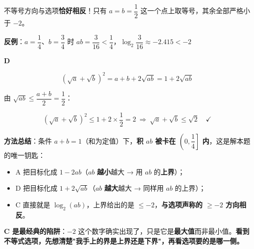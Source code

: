 \begin{answer}
不等号方向与选项\textbf{恰好相反}！只有 $a=b=\dfrac12$ 这一个点上取等号，其余全部严格小于 $-2$。

\textbf{反例}：$a=\dfrac14$、$b=\dfrac34$ 时 $ab=\dfrac3{16}<\dfrac14$，$\log_2\dfrac3{16}\approx-2.415<-2$ 

\par\medskip

\textbf{D }

\nopagebreak[4]
\[\left(\sqrt a+\sqrt b\right)^{2}=a+b+2\sqrt{ab}=1+2\sqrt{ab}\]

由 $\sqrt{ab}\le\dfrac{a+b}2=\dfrac12$：

\nopagebreak[4]
\[\left(\sqrt a+\sqrt b\right)^{2}\le1+2\times\frac12=2\ \Longrightarrow\ \sqrt a+\sqrt b\le\sqrt2\quad\checkmark\]

\begin{gktip}
\textbf{方法总结}：条件 $a+b=1$（和为定值）下，\textbf{积 $ab$ 被卡在 $\left(0,\dfrac14\right]$ 内}，这是解本题的唯一钥匙：
\begin{itemize}
\item A 把目标化成 $1-2ab$（$ab$ \textbf{越小}越大 → 用 $ab$ 的\textbf{上界}）；
\item D 把目标化成 $1+2\sqrt{ab}$（$ab$ \textbf{越大}越大 → 同样用 $ab$ 的上界）；
\item C 直接就是 $\log_2(ab)$，上界给出的是 $\le-2$，\textbf{与选项声称的 $\ge-2$ 方向相反}。
\end{itemize}

\textbf{C 是最经典的陷阱}：$-2$ 这个数字确实出现了，只是它是\textbf{最大值}而非最小值。\textbf{看到不等式选项，先想清楚"我手上的界是上界还是下界"，再看选项要的是哪一侧。}
\end{gktip}


\par\medskip

\end{answer}

